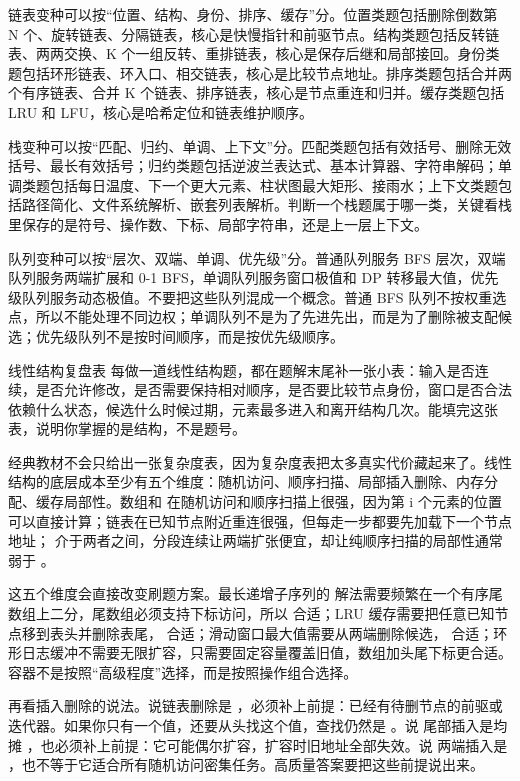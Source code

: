 链表变种可以按“位置、结构、身份、排序、缓存”分。位置类题包括删除倒数第 N 个、旋转链表、分隔链表，核心是快慢指针和前驱节点。结构类题包括反转链表、两两交换、K 个一组反转、重排链表，核心是保存后继和局部接回。身份类题包括环形链表、环入口、相交链表，核心是比较节点地址。排序类题包括合并两个有序链表、合并 K 个链表、排序链表，核心是节点重连和归并。缓存类题包括 LRU 和 LFU，核心是哈希定位和链表维护顺序。

栈变种可以按“匹配、归约、单调、上下文”分。匹配类题包括有效括号、删除无效括号、最长有效括号；归约类题包括逆波兰表达式、基本计算器、字符串解码；单调类题包括每日温度、下一个更大元素、柱状图最大矩形、接雨水；上下文类题包括路径简化、文件系统解析、嵌套列表解析。判断一个栈题属于哪一类，关键看栈里保存的是符号、操作数、下标、局部字符串，还是上一层上下文。

队列变种可以按“层次、双端、单调、优先级”分。普通队列服务 BFS 层次，双端队列服务两端扩展和 0-1 BFS，单调队列服务窗口极值和 DP 转移最大值，优先级队列服务动态极值。不要把这些队列混成一个概念。普通 BFS 队列不按权重选点，所以不能处理不同边权；单调队列不是为了先进先出，而是为了删除被支配候选；优先级队列不是按时间顺序，而是按优先级顺序。

\begin{principlebox}{线性结构复盘表}
每做一道线性结构题，都在题解末尾补一张小表：输入是否连续，是否允许修改，是否需要保持相对顺序，是否要比较节点身份，窗口是否合法依赖什么状态，候选什么时候过期，元素最多进入和离开结构几次。能填完这张表，说明你掌握的是结构，不是题号。
\end{principlebox}


经典教材不会只给出一张复杂度表，因为复杂度表把太多真实代价藏起来了。线性结构的底层成本至少有五个维度：随机访问、顺序扫描、局部插入删除、内存分配、缓存局部性。数组和  在随机访问和顺序扫描上很强，因为第 i 个元素的位置可以直接计算；链表在已知节点附近重连很强，但每走一步都要先加载下一个节点地址； 介于两者之间，分段连续让两端扩张便宜，却让纯顺序扫描的局部性通常弱于 。

这五个维度会直接改变刷题方案。最长递增子序列的  解法需要频繁在一个有序尾数组上二分，尾数组必须支持下标访问，所以  合适；LRU 缓存需要把任意已知节点移到表头并删除表尾， 合适；滑动窗口最大值需要从两端删除候选， 合适；环形日志缓冲不需要无限扩容，只需要固定容量覆盖旧值，数组加头尾下标更合适。容器不是按照“高级程度”选择，而是按照操作组合选择。

再看插入删除的说法。说链表删除是 ，必须补上前提：已经有待删节点的前驱或迭代器。如果你只有一个值，还要从头找这个值，查找仍然是 。说  尾部插入是均摊 ，也必须补上前提：它可能偶尔扩容，扩容时旧地址全部失效。说  两端插入是 ，也不等于它适合所有随机访问密集任务。高质量答案要把这些前提说出来。

